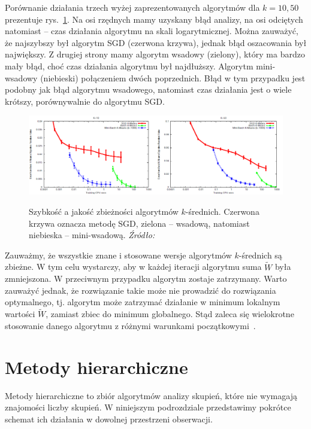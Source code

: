 \documentclass{praca1}
\begin{document}
Porównanie działania trzech wyżej zaprezentowanych algorytmów dla $k=10, 50$ prezentuje rys.~\ref{plot:000}. Na osi rzędnych mamy uzyskany błąd analizy, na osi odciętych natomiast -- czas działania algorytmu na skali logarytmicznej. Można zauważyć, że najszybszy był algorytm SGD (czerwona krzywa), jednak błąd oszacowania był największy. Z drugiej strony mamy algorytm wsadowy (zielony), który ma bardzo mały błąd, choć czas działania algorytmu był najdłuższy. Algorytm mini-wsadowy (niebieski) połączeniem dwóch poprzednich. Błąd w tym przypadku jest podobny jak błąd algorytmu wsadowego, natomiast czas działania jest o wiele krótszy, porównywalnie do algorytmu SGD. 

\begin{figure}[!h]
  \centering
  \includegraphics[width=450pt]{plot0.png}\\
  \caption{Szybkość a jakość zbieżności algorytmów $k$-średnich. Czerwona krzywa oznacza metodę SGD, zielona -- wsadową, natomiast niebieska -- mini-wsadową. \emph{Źródło:}~\cite{Sculley2010:webkmeans}}\label{plot:000}
\end{figure}


Zauważmy, że wszystkie znane i stosowane wersje algorytmów $k$-średnich są zbieżne. W tym celu wystarczy, aby w każdej iteracji algorytmu suma $\widetilde{W}$ była zmniejszona. W przeciwnym przypadku algorytm zostaje zatrzymany. Warto zauważyć jednak, że rozwiązanie takie może nie prowadzić do rozwiązania optymalnego, tj. algorytm może zatrzymać działanie w minimum lokalnym wartości $\widetilde{W}$, zamiast zbiec do minimum globalnego. Stąd zaleca się wielokrotne stosowanie danego algorytmu z różnymi warunkami początkowymi~\cite{Koronacki2005:statystyczne}.


\section{Metody hierarchiczne}

Metody hierarchiczne to zbiór algorytmów analizy skupień, które nie wymagają znajomości liczby skupień. W niniejszym podrozdziale przedstawimy pokrótce schemat ich działania w dowolnej przestrzeni obserwacji.
\end{document}
